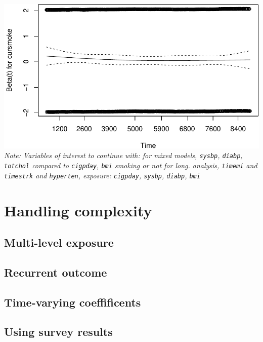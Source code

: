\documentclass[
]{book}
\begin{document}
\includegraphics{adv_epi_analysis_files/figure-latex/unnamed-chunk-210-1.pdf}
\emph{Note: Variables of interest to continue with:
for mixed models, \texttt{sysbp}, \texttt{diabp}, \texttt{totchol} compared to \texttt{cigpday}, \texttt{bmi} smoking or not
for long. analysis, \texttt{timemi} and \texttt{timestrk} and \texttt{hyperten}, exposure: \texttt{cigpday}, \texttt{sysbp}, \texttt{diabp}, \texttt{bmi}}

\hypertarget{handling-complexity}{%
\section{Handling complexity}\label{handling-complexity}}

\hypertarget{multi-level-exposure}{%
\subsection{Multi-level exposure}\label{multi-level-exposure}}

\hypertarget{recurrent-outcome}{%
\subsection{Recurrent outcome}\label{recurrent-outcome}}

\hypertarget{time-varying-coeffificents}{%
\subsection{Time-varying coeffificents}\label{time-varying-coeffificents}}

\hypertarget{using-survey-results}{%
\subsection{Using survey results}\label{using-survey-results}}
\end{document}
